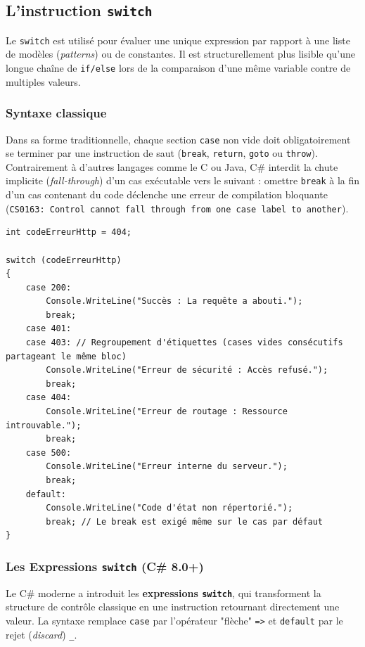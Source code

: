 \subsection{L'instruction \texttt{switch}}

Le \texttt{switch} est utilisé pour évaluer une unique expression par rapport à une liste de modèles (\emph{patterns}) ou de constantes. Il est structurellement plus lisible qu'une longue chaîne de \texttt{if/else} lors de la comparaison d'une même variable contre de multiples valeurs.

\subsubsection{Syntaxe classique}

Dans sa forme traditionnelle, chaque section \texttt{case} non vide doit obligatoirement se terminer par une instruction de saut (\texttt{break}, \texttt{return}, \texttt{goto} ou \texttt{throw}). Contrairement à d'autres langages comme le C ou Java, C\# interdit la chute implicite (\emph{fall-through}) d'un cas exécutable vers le suivant : omettre \texttt{break} à la fin d'un cas contenant du code déclenche une erreur de compilation bloquante (\texttt{CS0163: Control cannot fall through from one case label to another}).

\begin{lstlisting}[caption={Routage par instruction switch}]
int codeErreurHttp = 404;

switch (codeErreurHttp)
{
    case 200:
        Console.WriteLine("Succès : La requête a abouti.");
        break;
    case 401:
    case 403: // Regroupement d'étiquettes (cases vides consécutifs partageant le même bloc)
        Console.WriteLine("Erreur de sécurité : Accès refusé.");
        break;
    case 404:
        Console.WriteLine("Erreur de routage : Ressource introuvable.");
        break;
    case 500:
        Console.WriteLine("Erreur interne du serveur.");
        break;
    default:
        Console.WriteLine("Code d'état non répertorié.");
        break; // Le break est exigé même sur le cas par défaut
}
\end{lstlisting}

\subsubsection{Les Expressions \texttt{switch} (C\# 8.0+)}

Le C\# moderne a introduit les \textbf{expressions \texttt{switch}}, qui transforment la structure de contrôle classique en une instruction retournant directement une valeur. La syntaxe remplace \texttt{case} par l'opérateur "flèche" \texttt{=>} et \texttt{default} par le rejet (\emph{discard}) \texttt{\_}.

